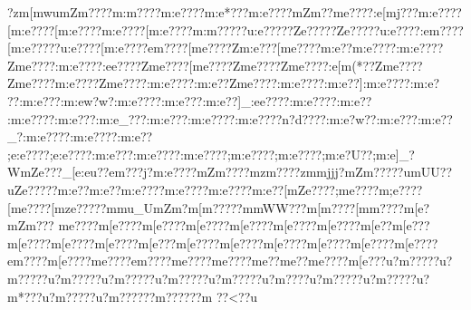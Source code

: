 {{{{{{{{{{{{{{{{{{{{{{{{{{{{{{{{{{{{{{{{{{{{{{{{{{{{{{{{{{{{{{{{{{{{{{{{{{{{{{{{{{{{{{{{{{{{{{{{{{{{{{{{{{{{{{{{{{{{{{{{{{{{{{{{{{{{{{{{{{{{{{{{{{{{{{{{{{{{{{{{{{{{{{{{{{{{{{{{{{{{{{{{{{{{{{{{{{{{{{{{{{{{{{{{{{{{{{{{{{{{{{{{{{{{{{{{{{{{{{{{{{{{{{{{{{{{{{{{{{{{{{{{{{{{{{{{{{{{{{{{{{{{{{{{{{{{{{{{{{{{{{{{{{{{{{{{{{{{{{{{{{{{{{{{{{{{{{{{{{{{{{{{{{{{{{{{{{{{{{{{{{{{{{{{{{{{{{{{{{{{{{{{{{{{{{{{{{{{{{{{{{{{{{{{{{{{{{{{{{{{{{{{{{{{{{{{{{{{{{{{{{{{{{{{{{{{{{{{{{{{{{{{{{{{{{{{{{{{{{{{{{{{{{{{{{{{{{{{{{{{{{{{{{{{{{{{{{{{{{{{{{{{{{{{{{{{{{{{{{{{{{{{{{{{{{{{{{{{{{{{{{{{{{{{{{{{{{{{{{{{{{{{{{{{{{{{{{{{{{{{{{{{{{{{{{{{{{{{{{{{{{{{{{{{{{{{{{{{{{{{{{{{{{{{{{{{{{{{{{{{{{{{{{{{{{{{{{{{{{{{{{{{{{{{{{{{{{{{{{{{{{{{{{{{{{{{{{{{{{{{{{{{{{{{{{{{{{{{{{{{{{{{{{{{{{{{{{{{{{{{{{{{{{{{{{{{{{{{{{{{{{{{{{{{{{{{{{{{{{{{{{{{{{{{{{{{{{{{{{{{{{{{{{{{{{{{{{{{{{{{{{{{{{{{{{{{{{{{{{{{{{{{{{{{{{{{{{{{{{{{{{{{{{{{{{{{{{{{{{{{{{{{{{{{{{{{{{{{{{{{{{{{{{{{{{{{{{{{{{{{{{{{{{{{{{{{{{{{{{{{{{{{{{{{{{{{{{{{{{{{{{{{{{{{{{{{{{{{{{{{{{{{{{{{{{{{{{{{{{{{{{{{{{{{{{{{{{{{{{{{{{{?zm[m}wu{mZm????{m:m????{m:e????{m:e*???{m:e????{mZm??{me????:e[mj???{m:e????[m:e????[m:e????{m:e????[m:e????{m:m?????u:e?????}Ze?????}Ze?????u:e????:e{m????[m:e?????u:e????[m:e????e{m????[me????Zm:e???[me????m:e??m:e????:m:e????Zme????:m:e????:ee????Zme????[me????Zme????Zme????:e[m(*??Zme????Zme????m:e????Zme????:m:e????:m:e??Zme????:m:e????:m:e??]:m:e????:m:e???:m:e???:m:ew?w?:m:e????:m:e???:m:e??]_:ee????:m:e????:m:e??:m:e????:m:e???}:m:e_???:m:e???:m:e????:m:e????n?d????:m:e?w??:m:e???:m:e??_?:m:e????:m:e????:m:e}??;e:e????;e:e????:m:e}???:m:e????:m:e????;m:e????;m:e????;m:e?U??;m:e]_?WmZe???_[e:eu}??e{m???j?m:e????{mZm????{mzm????zm{mjjj?{mZm?????u{mUU??{uZe?????m:e??{m:e??{m:e????{m:e????{m:e????{m:e??[mZe????;m{e????{m;e????[m{e????[mze?????m{mu}_U{mZm   ?m[m?????m{mWW???m[m????[m{m????{m[e?   {mZm??? {m{e????{m[e????{m[e????{m[e????{m[e????{m[e????{m[e????{m[e??{m[e???{m[e????{m[e????{m[e????{m[e???{m[e????{m[e????{m[e????{m[e????{m[e????{m[e????{e{m????{m[e????{m{e????{e{m????{m{e????{m{e????{m{e??{m{e??{m{e????{m[e???u?m?????u?m?????u?m?????u?m?????u?m?????u?m?????u?m????u?m?????u?m?????u?m*???u?m?????u?m?????}?m?????}?m
??<??u
}}}}}}}}}}}}}}}}}}}}}}}}}}}}}}}}}}}}}}}}}}}}}}}}}}}}}}}}}}}}}}}}}}}}}}}}}}}}}}}}}}}}}}}}}}}}}}}}}}}}}}}}}}}}}}}}}}}}}}}}}}}}}}}}}}}}}}}}}}}}}}}}}}}}}}}}}}}}}}}}}}}}}}}}}}}}}}}}}}}}}}}}}}}}}}}}}}}}}}}}}}}}}}}}}}}}}}}}}}}}}}}}}}}}}}}}}}}}}}}}}}}}}}}}}}}}}}}}}}}}}}}}}}}}}}}}}}}}}}}}}}}}}}}}}}}}}}}}}}}}}}}}}}}}}}}}}}}}}}}}}}}}}}}}}}}}}}}}}}}}}}}}}}}}}}}}}}}}}}}}}}}}}}}}}}}}}}}}}}}}}}}}}}}}}}}}}}}}}}}}}}}}}}}}}}}}}}}}}}}}}}}}}}}}}}}}}}}}}}}}}}}}}}}}}}}}}}}}}}}}}}}}}}}}}}}}}}}}}}}}}}}}}}}}}}}}}}}}}}}}}}}}}}}}}}}}}}}}}}}}}}}}}}}}}}}}}}}}}}}}}}}}}}}}}}}}}}}}}}}}}}}}}}}}}}}}}}}}}}}}}}}}}}}}}}}}}}}}}}}}}}}}}}}}}}}}}}}}}}}}}}}}}}}}}}}}}}}}}}}}}}}}}}}}}}}}}}}}}}}}}}}}}}}}}}}}}}}}}}}}}}}}}}}}}}}}}}}}}}}}}}}}}}}}}}}}}}}}}}}}}}}}}}}}}}}}}}}}}}}}}}}}}}}}}}}}}}}}}}}}}}}}}}}}}}}}}}}}}}}}}}}}}}}}}}}}}}}}}}}}}}}}}}}}}}}}}}}}}}}}}}}}}}}}}}}}}}}}}}}}}}}}}}}}}}}}}}}}}}}}}}}}}}}}}}}}}}}}}}}}}}}}}}}}}}}}}}}}}}}}}}}}}}}}}}}}}}}}}}}}}}}}}}}}}}}}}}}}}}}}}}}}}}}}}}}}}}}}}}}}}}}}}}}}}}}}}}}}}}}}}}}}}}}}}}}}}}}}}}}}}}}}}}}}}}}}}}}}}}}}}}}}}}}}}}}}}}}}}}}}}}}}}}}}}}}}}}}}}}}}}}}}}}}}}}}}}}}}}}}}}}}}}}}}}}}}}}}}}}}}}}}}
